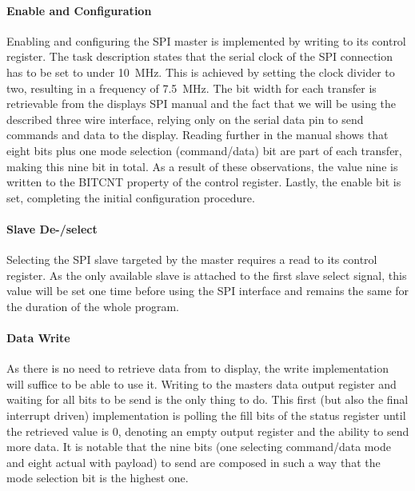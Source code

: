 	   		\paragraph{Enable and Configuration} %
	   		\label{par:enable}
	   			Enabling and configuring the SPI master is implemented by writing to its control register. The task description states that the serial clock of the SPI connection has to be set to under \SI{10}{\mega\hertz}. This is achieved by setting the clock divider to two, resulting in a frequency of \SI{7.5}{\mega\hertz}. The bit width for each transfer is retrievable from the displays SPI manual and the fact that we will be using the described three wire interface, relying only on the serial data pin to send commands and data to the display. Reading further in the manual shows that eight bits plus one mode selection (command/data) bit are part of each transfer, making this nine bit in total. As a result of these observations, the value nine is written to the BITCNT property of the control register. Lastly, the enable bit is set, completing the initial configuration procedure.

	   		\paragraph{Slave De-/select} %
	   		\label{par:slave_de_select}
	   			Selecting the SPI slave targeted by the master requires a read to its control register. As the only available slave is attached to the first slave select signal, this value will be set one time before using the SPI interface and remains the same for the duration of the whole program.

	   		\paragraph{Data Write} %
	   		\label{par:data_write}
	   			As there is no need to retrieve data from to display, the write implementation will suffice to be able to use it. Writing to the masters data output register and waiting for all bits to be send is the only thing to do. This first (but also the final interrupt driven) implementation is polling the fill bits of the status register until the retrieved value is 0, denoting an empty output register and the ability to send more data.
	   			It is notable that the nine bits (one selecting command/data mode and eight actual with payload) to send are composed in such a way that the mode selection bit is the highest one.

